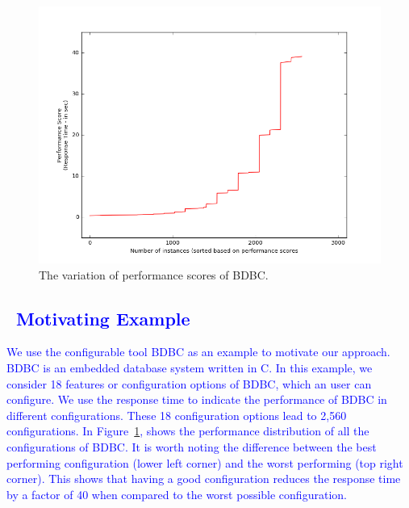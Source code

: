 \documentclass[smallextended]{svjour3}       %
\newcommand{\respto}[1]{
    \fcolorbox{black}{black!15}{
    \label{response:#1}
    \textbf{R-{#1}}}
}
\begin{document}

\begin{figure}[t]
\centering
\includegraphics[width=\columnwidth]{Figures/motivation}
\caption{The variation of performance scores of BDBC. }
\label{fig:motivation}
\end{figure}


\textcolor{blue}{
\section{\respto{2e}~Motivating Example}
We use the configurable tool BDBC as an example to motivate our approach. BDBC is an embedded database system  written  in C. In this example, we consider 18 features or configuration options of BDBC, which an user can configure. We use the response time to indicate the performance of BDBC in different configurations. These 18 configuration options lead to 2,560 configurations. 
In Figure~\ref{fig:motivation}, shows the performance distribution of all the configurations of BDBC. It is worth noting the difference between the best performing configuration (lower left corner) and the worst performing (top right corner). This shows that having a good configuration reduces the response time by a factor of 40 when compared to the worst possible configuration. 
}
\end{document}
